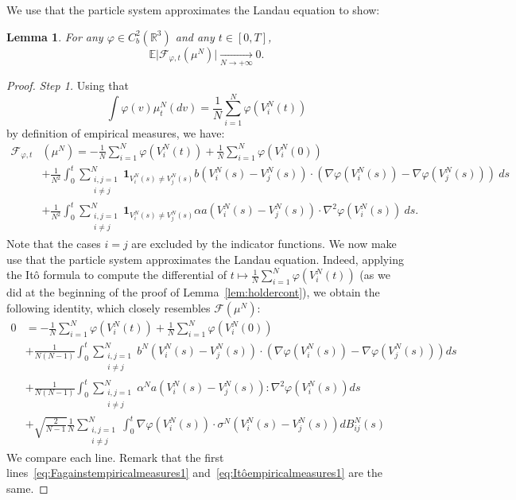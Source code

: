 \documentclass[11pt,a4paper]{article}
\theoremstyle{definition}
\theoremstyle{plain}
\newtheorem{lemma}[defi]{Lemma}
\begin{document}
We use that the particle system approximates the Landau equation to show:
\begin{lemma}
    \label{aswsolution-empirical measures}
    For any $\varphi\in C^2_b(\mathbb{R}^3)$ and any $t\in[0,T]$,
    $$\mathbb{E}\vert \mathcal{F}_{\varphi,t}(\mu^N)\vert\xrightarrow[N\rightarrow+\infty]{}0.$$
\end{lemma}
\begin{proof}
    \textit{Step 1.} Using that
    $$\int \varphi(v)\mu^N_t(dv)=\frac{1}{N}\sum_{i=1}^N\varphi(V^N_i(t))$$
    by definition of empirical measures, we have:
    \begin{align}
    \label{eq:Fagainstempiricalmeasures1}
    \mathcal{F}_{\varphi,t}&(\mu^N) = -\frac{1}{N} \sum_{i=1}^N\varphi(V^N_i(t)) + \frac{1}{N} \sum_{i=1}^N\varphi(V^N_i(0))\\
    \label{eq:Fagainstempiricalmeasures2}
    &+ \frac{1}{N^2}\int_0^t \sum_{\substack{i,j=1\\ i\neq j}}^N \mathbf{1}_{V^N_i(s)\neq V^N_j(s)}b(V^N_i(s)-V^N_j(s)) \cdot (\nabla\varphi(V^N_i(s))-\nabla\varphi(V^N_j(s)))\ ds\\
    \label{eq:Fagainstempiricalmeasures3}
    &+\frac{1}{N^2} \int_0^t \sum_{\substack{i,j=1\\ i\neq j}}^N \mathbf{1}_{V^N_i(s)\neq V^N_j(s)}\alpha a(V^N_i(s)-V^N_j(s)) \cdot \nabla^2\varphi(V^N_i(s))\ ds.
    \end{align}  
    Note that the cases $i=j$ are excluded by the indicator functions. We now make use that the particle system approximates the Landau equation. Indeed, applying the Itô formula to compute the differential of $t \mapsto \frac{1}{N}\sum_{i=1}^N\varphi(V^N_i(t))$ (as we did at the beginning of the proof of Lemma~\ref{lem:holdercont}), we obtain the following identity, which closely resembles $\mathcal{F}(\mu^N)$:
    \begin{align}
    \label{eq:Itôempiricalmeasures1}
       0 &= -\frac{1}{N}\sum_{i=1}^N\varphi(V^N_i(t))+\frac{1}{N}\sum_{i=1}^N\varphi(V^N_i(0)) \\
       \label{eq:Itôempiricalmeasures2}
       &+ \frac{1}{N(N-1)}\int_0^t \sum_{\substack{i,j=1\\ i\neq j}}^N  b^N\left(V^N_i(s) -V^N_j(s)\right) \cdot (\nabla\varphi\left(V^N_i(s)\right)-\nabla\varphi\left(V^N_j(s)\right)) ds\ \\
       \label{eq:Itôempiricalmeasures3}
       &+ \frac{1}{N(N-1)} \int_0^t \sum_{\substack{i,j=1\\ i\neq j}}^N  \alpha^Na\left(V^N_i(s) -V^N_j(s)\right):\nabla^2\varphi\left(V^N_i(s)\right)ds\\
       \label{eq:Itôempiricalmeasures4}
       &+\sqrt{\frac{2}{N-1}}\frac{1}{N}\sum_{\substack{i,j=1\\ i\neq j}}^N \int_0^t  \nabla \varphi\left(V^N_i(s)\right)\cdot \sigma^N \left(V^N_i(s) - V^N_j(s)\right)dB^N_{ij}(s)
    \end{align}
    We compare each line. Remark that the first lines~\eqref{eq:Fagainstempiricalmeasures1} and~\eqref{eq:Itôempiricalmeasures1} are the same.
    

\end{proof}
\end{document}
